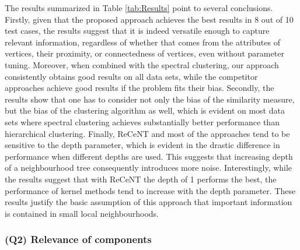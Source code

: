The results summarized in Table \ref{tab:Results} point to several conclusions.
Firstly, given that the proposed approach achieves the best results in 8 out of 10 test cases, the results suggest that it is indeed versatile enough to capture relevant information, regardless of whether  that comes from the attributes of vertices, their proximity, or connectedness  of vertices, even without parameter tuning.
Moreover, when combined with the spectral clustering, our approach consistently obtains good results on all data sets, while the competitor approaches achieve good results if the problem fits their bias.
Secondly, the results show that one has to consider not only the bias of the similarity measure, but the bias of the clustering algorithm as well, which is evident on most data sets where spectral clustering achieves substantially better performance than hierarchical clustering.
Finally, ReCeNT and most of the approaches tend to be sensitive to the depth parameter, which is evident in the drastic difference in performance when different depths are used.
This suggests that increasing depth of a neighbourhood tree consequently introduces more noise.
Interestingly, while the results suggest that with ReCeNT the depth of 1 performs the best, the performance of kernel methods tend to increase with the depth parameter.
These results justify the basic assumption of this approach that important information is contained in small local neighbourhoods.











\subsubsection{\textbf{(Q2) Relevance of components}}

